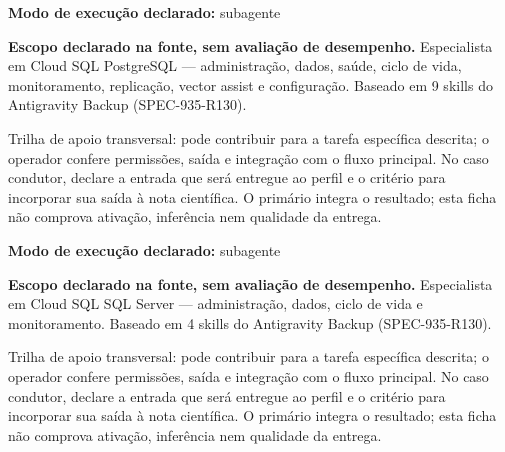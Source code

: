 \begin{arquitetura}
\textbf{Modo de execução declarado:} subagente
\end{arquitetura}


\begin{descricao}
\textbf{Escopo declarado na fonte, sem avaliação de desempenho.}
Especialista em Cloud SQL PostgreSQL — administração, dados, saúde, ciclo de vida, monitoramento, replicação, vector assist e configuração. Baseado em 9 skills do Antigravity Backup (SPEC-935-R130).
\end{descricao}

\begin{funcao}
Trilha de apoio transversal: pode contribuir para a tarefa específica descrita; o operador confere permissões, saída e integração com o fluxo principal. No caso condutor, declare a entrada que será entregue ao perfil e o critério para incorporar sua saída à nota científica. O primário integra o resultado; esta ficha não comprova ativação, inferência nem qualidade da entrega.
\end{funcao}

\begin{arquitetura}
\textbf{Modo de execução declarado:} subagente
\end{arquitetura}


\begin{descricao}
\textbf{Escopo declarado na fonte, sem avaliação de desempenho.}
Especialista em Cloud SQL SQL Server — administração, dados, ciclo de vida e monitoramento. Baseado em 4 skills do Antigravity Backup (SPEC-935-R130).
\end{descricao}

\begin{funcao}
Trilha de apoio transversal: pode contribuir para a tarefa específica descrita; o operador confere permissões, saída e integração com o fluxo principal. No caso condutor, declare a entrada que será entregue ao perfil e o critério para incorporar sua saída à nota científica. O primário integra o resultado; esta ficha não comprova ativação, inferência nem qualidade da entrega.
\end{funcao}

